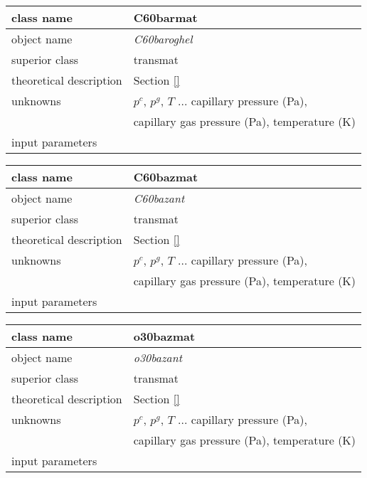 \begin{center}
\begin{tabular}{|l|l|}
\hline
class name & {\sf C60barmat}\index{class!{\sf C60barmat}}
\\ \hline
object name & {\it C60baroghel}\index{instance!{\it C60baroghelB}}
\\ \hline
superior class & {\sf transmat}
\\ \hline
theoretical description & Section \ref{}
\\ \hline
unknowns & $p^c$, $p^g$, $T$ ... capillary pressure (Pa), 
\\
 & capillary gas pressure (Pa), temperature (K)
\\ \hline
input parameters & 
\\ \hline
\end{tabular}
\end{center}



\begin{center}
\begin{tabular}{|l|l|}
\hline
class name & {\sf C60bazmat}\index{class!{\sf C60bazmat}}
\\ \hline
object name & {\it C60bazant}\index{instance!{\it C60bazantB}}
\\ \hline
superior class & {\sf transmat}
\\ \hline
theoretical description & Section \ref{}
\\ \hline
unknowns & $p^c$, $p^g$, $T$ ... capillary pressure (Pa), 
\\
 & capillary gas pressure (Pa), temperature (K)
\\ \hline
input parameters & 
\\ \hline
\end{tabular}
\end{center}



\begin{center}
\begin{tabular}{|l|l|}
\hline
class name & {\sf o30bazmat}\index{class!{\sf o30bazmat}}
\\ \hline
object name & {\it o30bazant}\index{instance!{\it o30bazantB}}
\\ \hline
superior class & {\sf transmat}
\\ \hline
theoretical description & Section \ref{}
\\ \hline
unknowns & $p^c$, $p^g$, $T$ ... capillary pressure (Pa), 
\\
 & capillary gas pressure (Pa), temperature (K)
\\ \hline
input parameters & 
\\ \hline
\end{tabular}
\end{center}



